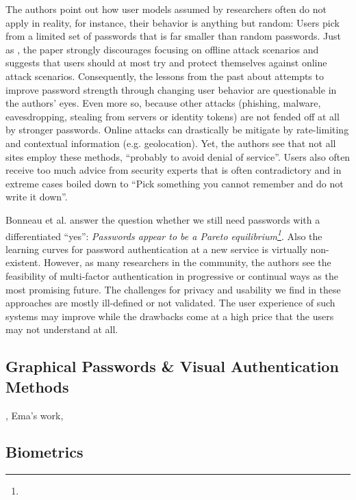 The authors point out how user models assumed by researchers often do not apply in reality, for instance, their behavior is anything but random: Users pick from a limited set of passwords that is far smaller than random passwords. Just as \cite{Florencio2014PasswordPortfoliosFiniteUser}, the paper strongly discourages focusing on offline attack scenarios and suggests that users should at most try and protect themselves against online attack scenarios. Consequently, the lessons from the past about attempts to improve password strength through changing user behavior are questionable in the authors' eyes. Even more so, because other attacks (phishing, malware, eavesdropping, stealing from servers or identity tokens) are not fended off at all by stronger passwords. Online attacks can drastically be mitigate by rate-limiting and contextual information (e.g. geolocation). Yet, the authors see that not all sites employ these methods, ``probably to avoid denial of service''. Users also often receive too much advice from security experts that is often contradictory and in extreme cases boiled down to ``Pick something you cannot remember and do not write it down''. 

Bonneau et al. answer the question whether we still need passwords with a differentiated ``yes'': \textit{Passwords appear to be a Pareto equilibrium\footnote{}}. Also the learning curves for password authentication at a new service is virtually non-existent. However, as many researchers in the community, the authors see the feasibility of multi-factor authentication in progressive or continual ways as the most promising future. The challenges for privacy and usability we find in these approaches are mostly ill-defined or not validated. The user experience of such systems may improve while the drawbacks come at a high price that the users may not understand at all. 

	\subsection{Graphical Passwords \& Visual Authentication Methods}



, Ema's work, \cite{Renaud2009VisualSnakeOil} 

	\subsection{Biometrics}
	

